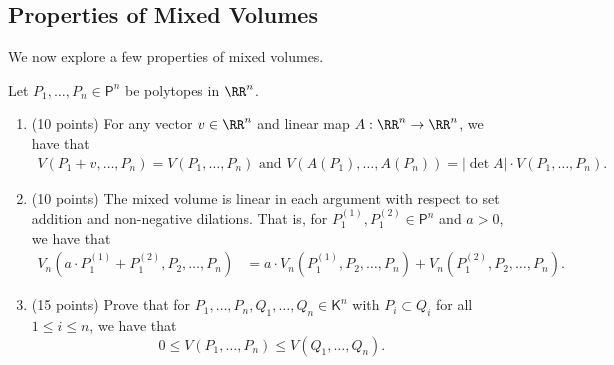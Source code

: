\documentclass[11pt]{article}
\begin{document}
\subsection{Properties of Mixed Volumes}
We now explore a few properties of mixed volumes. 

\begin{prob} [35 points] \label{some-properties}
    Let $P_1, \ldots, P_n \in \mathsf{P}^n$ be polytopes in $\RR^n$. 
    \begin{enumerate}[label = (\alph*)]
        \item (10 points) For any vector $v \in \RR^n$ and linear map $A : \RR^n \to \RR^n$, we have that  
        \begin{align*}
            V(P_1 + v, \ldots, P_n) = V(P_1, \ldots, P_n) \text{ and } V(A(P_1), \ldots, A(P_n)) = |\det A| \cdot V(P_1, \ldots, P_n).
        \end{align*}
        
        \item (10 points) The mixed volume is linear in each argument with respect to set addition and non-negative dilations. That is, for $P_1^{(1)}, P_1^{(2)} \in \mathsf{P}^n$ and $a > 0$, we have that 
        \begin{align*}
            V_n(a \cdot P_1^{(1)} + P_1^{(2)}, P_2, \ldots, P_n) & = a \cdot V_n(P_1^{(1)}, P_2, \ldots, P_n) + V_n(P_1^{(2)}, P_2, \ldots, P_n).
        \end{align*}

        \item (15 points) Prove that for $P_1, \ldots, P_n, Q_1, \ldots, Q_n \in \mathsf{K}^n$ with $P_i \subset Q_i$ for all $1 \leq i \leq n$, we have that 
        \[
            0 \leq V(P_1, \ldots, P_n) \leq V(Q_1, \ldots, Q_n).
        \]
    \end{enumerate}
\end{prob}
\end{document}
